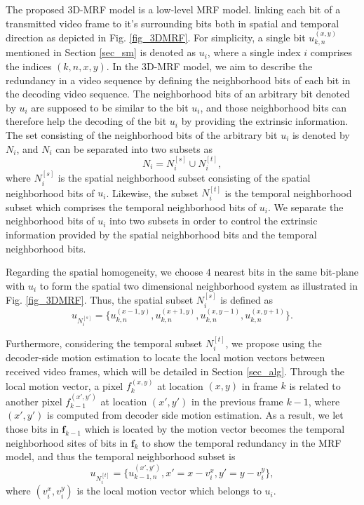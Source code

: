 \documentclass[10pt,twocolumn,twoside]{IEEEtran}
\begin{document}
The proposed 3D-MRF model is a low-level MRF model. linking each bit of a transmitted video frame to it's surrounding bits both in spatial and temporal direction as depicted in {Fig. \ref{fig_3DMRF}}. For simplicity, a single bit $u_{k,n}^{(x,y)}$ mentioned in Section \ref{sec_sm} is denoted as $u_i$, where a single index $i$ comprises the indices $(k,n,x,y)$. In the 3D-MRF model, we aim to describe the redundancy in a video sequence by defining the neighborhood bits of each bit in the decoding video sequence. The neighborhood bits of an arbitrary bit denoted by $u_i$ are supposed to be similar to the bit $u_i$, and those neighborhood bits can therefore help the decoding of the bit $u_i$ by providing the extrinsic information. The set consisting of the neighborhood bits of the arbitrary bit $u_i$ is denoted by $\mathit{N}_i $, and $\mathit{N}_i $ can be separated into two subsets as
\begin{equation}
\mathit{N}_i = N_i^{[s]} \cup N_i^{[t]}, 
\end{equation}
where $N_i^{[s]}$ is the spatial neighborhood subset consisting of the spatial neighborhood bits of $u_i$. Likewise, the subset $N_i^{[t]}$ is the temporal neighborhood subset which comprises the temporal neighborhood bits of $u_i$. We separate the neighborhood bits of $u_i$ into two subsets in order to control the extrinsic information provided by the spatial neighborhood bits and the temporal neighborhood bits.

Regarding the spatial homogeneity, we choose $4$ nearest bits in the same bit-plane with $u_i$ to form the spatial two dimensional neighborhood system as illustrated in Fig. \ref{fig_3DMRF}. Thus, the spatial subset $N_i^{[s]}$ is defined as
\begin{equation}
u_{N_i^{[s]}} = \{ u_{k,n}^{(x-1,y)}, u_{k,n}^{(x+1,y)}, u_{k,n}^{(x,y-1)}, u_{k,n}^{(x,y+1)} \}.
\label{eq_Nis}
\end{equation}

Furthermore, considering the temporal subset $N_i^{[t]}$, we propose using the decoder-side motion estimation to locate the local motion vectors between received video frames, which will be detailed in Section \ref{sec_alg}. Through the local motion vector, a pixel $f_{k}^{(x,y)}$ at location $(x,y)$ in frame $k$ is related to another pixel $f_{k-1}^{(x',y')}$ at location $(x',y')$ in the previous frame $k-1$, where $(x',y')$ is computed from decoder side motion estimation. As a result, we let those bits in $\mathbf{f}_{k-1}$ which is located by the motion vector becomes the temporal neighborhood sites of bits in $\mathbf{f}_{k}$ to show the temporal redundancy in the MRF model, and thus the temporal neighborhood subset is
\begin{equation}
u_{N_i^{[t]}} = \{u_{k-1,n}^{(x',y')}, x' = x - v_i^x, y' = y - v_i^y\},
\label{eq_Nit}
\end{equation} 
where $(v_i^x,  v_i^y)$ is the local motion vector which belongs to $u_i$. 
\end{document}
